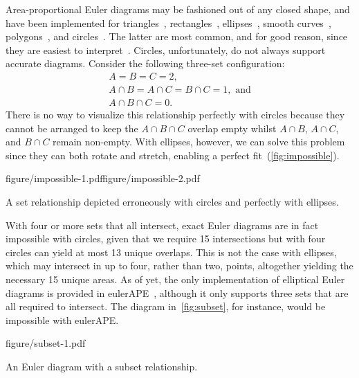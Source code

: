 \documentclass[
  oneside,
  openany,
  numbers=noendperiod,
  parskip=half,
  bibliography=totoc
]{scrbook}\usepackage[]{graphicx}\usepackage{xcolor}
\newcommand{\pkg}[1]{{\fontseries{b}\selectfont #1}}
\begin{document}
Area-proportional Euler diagrams may be fashioned out of any closed shape, and
have been implemented for triangles~\citep{Swinton_2011},
rectangles~\citep{Swinton_2011}, ellipses~\citep{Micallef_2014a}, smooth
curves~\citep{Micallef_2014}, polygons~\citep{Swinton_2011}, and
circles~\citep{Wilkinson_2012,Kestler_2008,Swinton_2011}. The latter are
most common, and for good reason, since they are easiest to
interpret~\citep{Blake_2016}. Circles, unfortunately, do not always support
accurate diagrams. Consider the following
three-set configuration:
\[
\begin{gathered}
A = B = C = 2,\\
A \cap B = A \cap C = B \cap C = 1,\text{ and}\\
A \cap B \cap C = 0.
\end{gathered}
\]
There is no way to visualize this relationship perfectly with circles because
they cannot be arranged to keep the $A \cap B \cap C$ overlap empty whilst
$A \cap B$, $A \cap C$, and $B \cap C$ remain non-empty. With ellipses, however,
we can solve this problem since they can both rotate and stretch, enabling
a perfect fit~(\cref{fig:impossible}).

\begin{marginfigure}
figure/impossible-1.pdffigure/impossible-2.pdf
\caption{A set relationship depicted erroneously with circles and perfectly with
ellipses.}
\label{fig:impossible}
\end{marginfigure}


With four or more sets that all intersect, exact Euler diagrams are in fact
impossible with circles, given that we require 15 intersections but with four circles
can yield at most 13 unique overlaps. This is not the case with ellipses, which
may intersect in up to four, rather than two, points, altogether yielding
the necessary 15 unique areas. As of yet, the only implementation of
elliptical Euler diagrams is provided in \pkg{eulerAPE}~\citep{Micallef_2014a}, although
it only supports three sets that are all required to intersect. The
diagram in~\cref{fig:subset}, for instance, would be impossible
with \pkg{eulerAPE}.

\begin{marginfigure}
figure/subset-1.pdf
\caption{An Euler diagram with a subset relationship.}
\label{fig:subset}
\end{marginfigure}
\end{document}
